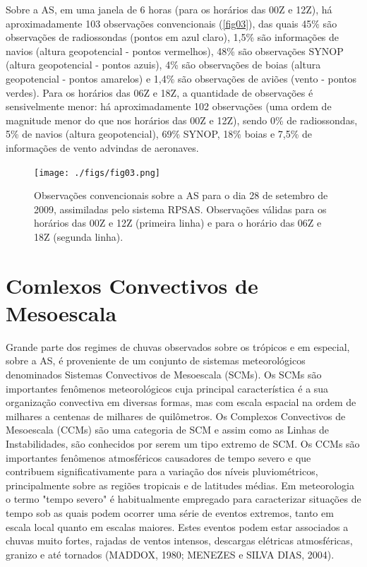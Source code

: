 Sobre a AS, em uma janela de 6 horas (para os horários das 00Z e 12Z), há aproximadamente 103 observações convencionais (\autoref{fig03}), das quais 45\% são observações de radiossondas (pontos em azul claro), 1,5\% são informações de navios (altura geopotencial - pontos vermelhos), 48\% são observações SYNOP (altura geopotencial - pontos azuis), 4\% são observações de boias (altura geopotencial - pontos amarelos) e 1,4\% são observações de aviões (vento - pontos verdes). Para os horários das 06Z e 18Z, a quantidade de observações é sensivelmente menor: há aproximadamente 102 observações (uma ordem de magnitude menor do que nos horários das 00Z e 12Z), sendo 0\% de radiossondas, 5\% de navios (altura geopotencial), 69\% SYNOP, 18\% boias e 7,5\% de informações de vento advindas de aeronaves.

\begin{figure}
\centering
\texttt{[image: ./figs/fig03.png]}
\caption{Observações convencionais sobre a AS para o dia 28 de setembro de 2009, assimiladas pelo sistema RPSAS. Observações válidas para os horários das 00Z e 12Z (primeira linha) e para o horário das 06Z e 18Z (segunda linha).}
\label{fig03}
\end{figure}

\section{Comlexos Convectivos de Mesoescala}
\label{ss:ccm}

Grande parte dos regimes de chuvas observados sobre os trópicos e em especial, sobre a AS, é proveniente de um conjunto de sistemas meteorológicos denominados Sistemas Convectivos de Mesoescala (SCMs). Os SCMs são importantes fenômenos meteorológicos cuja principal característica é a sua organização convectiva em diversas formas, mas com escala espacial na ordem de milhares a centenas de milhares de quilômetros.
Os Complexos Convectivos de Mesoescala (CCMs) são uma categoria de SCM e assim como as Linhas de Instabilidades, são conhecidos por serem um tipo extremo de SCM. Os CCMs são importantes fenômenos atmosféricos causadores de tempo severo e que contribuem significativamente para a variação dos níveis pluviométricos, principalmente sobre as regiões tropicais e de latitudes médias. Em meteorologia o termo "tempo severo" é habitualmente empregado para caracterizar situações de tempo sob as quais podem ocorrer uma série de eventos extremos, tanto em escala local quanto em escalas maiores. Estes eventos podem estar associados a chuvas muito fortes, rajadas de ventos intensos, descargas elétricas atmosféricas, granizo e até tornados (MADDOX, 1980; MENEZES e SILVA DIAS, 2004).

